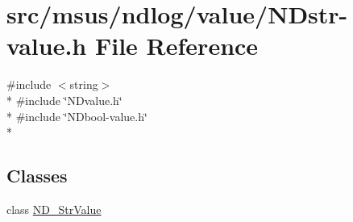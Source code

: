\hypertarget{_n_dstr-value_8h}{\section{src/msus/ndlog/value/\-N\-Dstr-\/value.h File Reference}
\label{_n_dstr-value_8h}
}
{\ttfamily \#include $<$string$>$}\\*
{\ttfamily \#include \char`\"{}N\-Dvalue.\-h\char`\"{}}\\*
{\ttfamily \#include \char`\"{}N\-Dbool-\/value.\-h\char`\"{}}\\*
\subsection*{Classes}
\begin{DoxyCompactItemize}
\item 
class \hyperlink{class_n_d___str_value}{N\-D\-\_\-\-Str\-Value}
\end{DoxyCompactItemize}
